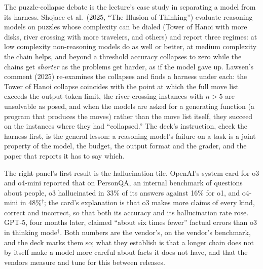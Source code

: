 \documentclass[11pt,letterpaper]{article}
\begin{document}
The puzzle-collapse debate is the lecture's case study in separating a model from its harness. Shojaee et al.\ (2025, ``The Illusion of Thinking'') evaluate reasoning models on puzzles whose complexity can be dialed (Tower of Hanoi with more disks, river crossing with more travelers, and others) and report three regimes: at low complexity non-reasoning models do as well or better, at medium complexity the chain helps, and beyond a threshold accuracy collapses to zero while the chains get \emph{shorter} as the problems get harder, as if the model gave up. Lawsen's comment (2025) re-examines the collapses and finds a harness under each: the Tower of Hanoi collapse coincides with the point at which the full move list exceeds the output-token limit, the river-crossing instances with $n>5$ are unsolvable as posed, and when the models are asked for a generating function (a program that produces the moves) rather than the move list itself, they succeed on the instances where they had ``collapsed.'' The deck's instruction, check the harness first, is the general lesson: a reasoning model's failure on a task is a joint property of the model, the budget, the output format and the grader, and the paper that reports it has to say which.

The right panel's first result is the hallucination tile. OpenAI's system card for o3 and o4-mini reported that on PersonQA, an internal benchmark of questions about people, o3 hallucinated in 33\% of its answers against 16\% for o1, and o4-mini in 48\%$^\dagger$; the card's explanation is that o3 makes more claims of every kind, correct and incorrect, so that both its accuracy and its hallucination rate rose. GPT-5, four months later, claimed ``about six times fewer'' factual errors than o3 in thinking mode$^\dagger$. Both numbers are the vendor's, on the vendor's benchmark, and the deck marks them so; what they establish is that a longer chain does not by itself make a model more careful about facts it does not have, and that the vendors measure and tune for this between releases.
\end{document}
